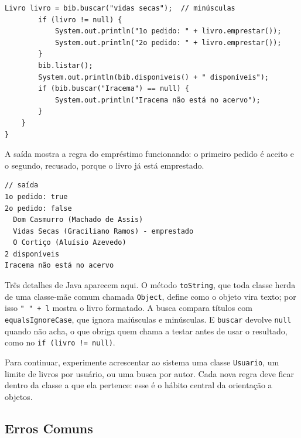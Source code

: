 \begin{codigo}
\begin{Verbatim}[breaklines=true, breaksymbolleft={}, fontsize=\footnotesize]
        Livro livro = bib.buscar("vidas secas");  // minúsculas
        if (livro != null) {
            System.out.println("1o pedido: " + livro.emprestar());
            System.out.println("2o pedido: " + livro.emprestar());
        }
        bib.listar();
        System.out.println(bib.disponiveis() + " disponíveis");
        if (bib.buscar("Iracema") == null) {
            System.out.println("Iracema não está no acervo");
        }
    }
}
\end{Verbatim}
\end{codigo}

A saída mostra a regra do empréstimo funcionando: o primeiro pedido é aceito e o segundo, recusado, porque o livro já está emprestado.

\begin{codigo}
\begin{Verbatim}[breaklines=true, breaksymbolleft={}, fontsize=\footnotesize]
// saída
1o pedido: true
2o pedido: false
  Dom Casmurro (Machado de Assis)
  Vidas Secas (Graciliano Ramos) - emprestado
  O Cortiço (Aluísio Azevedo)
2 disponíveis
Iracema não está no acervo
\end{Verbatim}
\end{codigo}

Três detalhes de Java aparecem aqui. O método \texttt{toString}, que toda classe herda de uma classe-mãe comum chamada \texttt{Object}, define como o objeto vira texto; por isso \texttt{"  " + l} mostra o livro formatado. A busca compara títulos com \texttt{equalsIgnoreCase}, que ignora maiúsculas e minúsculas. E \texttt{buscar} devolve \texttt{null} quando não acha, o que obriga quem chama a testar antes de usar o resultado, como no \texttt{if (livro != null)}.

Para continuar, experimente acrescentar ao sistema uma classe \texttt{Usuario}, um limite de livros por usuário, ou uma busca por autor. Cada nova regra deve ficar dentro da classe a que ela pertence: esse é o hábito central da orientação a objetos.

\subsection{Erros Comuns}

